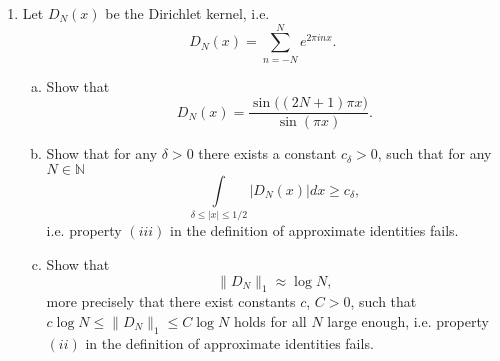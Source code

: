\documentclass[a4paper]{article}
\newcommand{\Q}{\mathbb{Q}}
\begin{document}
\begin{enumerate}
\begin{proof}
    Thus, $\{f_{k_n}\}$ is a uniformly bounded and equicontinuous sequence of functions. Therefore, by Arzela-Ascoli, there is a further subsequence
    (which we will continue denoting by $\{ f_{k_n} \}$ that converges uniformly.

    Because $\{ f_{k_n} \}$ is a uniformly convergent sequence of continuous functions, it converges to a continuous function $f(x)$. As already
    stated $f(q) = 0$ for all $q \in \Q$, therefore $\|f\|_{L^2} = 0$. $f_{k_n} \to f$ uniformly implies $f_{k_n} \to f$ in $L^2$. Therefore,
    $\|f_{k_n}\|_{L^2} \to 0$, which contradicts $\|f_k\|_{L^2} = 1$ for all $k$. Therefore, there must be a point $x_1 \in [0,1]$ such that
    $f_{k_n}(x_1) \to y$ for some subsequence $\{ f_{k_n} \}$ and some $y \neq 0$.

    Let $\varepsilon>0$ with $\varepsilon < \frac{y}{2}$. Then for $n$ sufficiently large and $x \in { [x_1 - \frac{y}{2C}, x_1 + \frac{y}{2C}] }$ where $C$ is the uniform bound on the
    derivatives, $|f_{k_n}(x)| \geq \frac{y}{2} - \varepsilon.$ Then
    \begin{align*}
      \langle f_{k_n}, \chi_{[x_1 - \frac{y}{2C}, x_1 + \frac{y}{2C}]} \rangle_{L^2} &= \int_{x_1 - \frac{y}{2C}}^{x_1 + \frac{y}{2C}} |f_{k_n}(x)|^2 dx \\
      &\geq \frac{y}{C} \left( \frac{y}{2} - \varepsilon \right) > 0
    \end{align*}

    But an orthonormal system in a Hilbert space must converge weakly to 0, so we have reached a contradiction. Therefore, $\{ f'_k \}$ cannot be
    uniformly bounded.

  \end{proof}

\item Let $D_N (x)$ be the Dirichlet kernel, i.e. $$ D_N (x) = \sum_{n=-N}^N e^{2\pi i nx}. $$

\begin{enumerate}[(a)]
\item Show that $$ D_N (x)  = \frac{\sin \big( (2N+1) \pi x\big)}{ \sin (\pi x)}. $$
\item Show that for any $\delta > 0$ there exists a constant $c_\delta >0$, such that for any $N \in \mathbb N$ $$ \int\limits_{\delta \le |x| \le 1/2} |D_N (x) | dx \ge c_\delta,$$
i.e. property $(iii)$ in the definition of approximate identities fails.
\item Show that   $$ \| D_N \|_1 \approx \log N,$$ more precisely that there exist constants $c$, $C>0$, such that $ c\log N \le  \| D_N \|_1 \le C \log N$ holds for all $N$ large enough,  i.e. property $(ii)$ in the definition of approximate identities fails.


\end{enumerate}
\end{enumerate}
\end{document}
